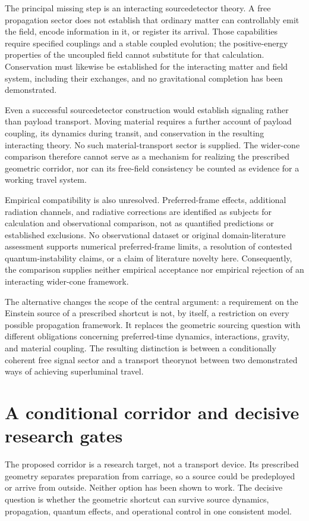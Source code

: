 \documentclass[11pt]{article}
\begin{document}
The principal missing step is an interacting source\textendash{}\allowbreak{}detector theory. A free propagation sector does not establish that ordinary matter can controllably emit the field, encode information in it, or register its arrival. Those capabilities require specified couplings and a stable coupled evolution; the positive-energy properties of the uncoupled field cannot substitute for that calculation. Conservation must likewise be established for the interacting matter and field system, including their exchanges, and no gravitational completion has been demonstrated.

Even a successful source\textendash{}\allowbreak{}detector construction would establish signaling rather than payload transport. Moving material requires a further account of payload coupling, its dynamics during transit, and conservation in the resulting interacting theory. No such material-transport sector is supplied. The wider-cone comparison therefore cannot serve as a mechanism for realizing the prescribed geometric corridor, nor can its free-field consistency be counted as evidence for a working travel system.

Empirical compatibility is also unresolved. Preferred-frame effects, additional radiation channels, and radiative corrections are identified as subjects for calculation and observational comparison, not as quantified predictions or established exclusions. No observational dataset or original domain-literature assessment supports numerical preferred-frame limits, a resolution of contested quantum-instability claims, or a claim of literature novelty here. Consequently, the comparison supplies neither empirical acceptance nor empirical rejection of an interacting wider-cone framework.

The alternative changes the scope of the central argument: a requirement on the Einstein source of a prescribed shortcut is not, by itself, a restriction on every possible propagation framework. It replaces the geometric sourcing question with different obligations concerning preferred-time dynamics, interactions, gravity, and material coupling. The resulting distinction is between a conditionally coherent free signal sector and a transport theory\textemdash{}not between two demonstrated ways of achieving superluminal travel.

\section{A conditional corridor and decisive research gates}
The proposed corridor is a research target, not a transport device. Its prescribed geometry separates preparation from carriage, so a source could be predeployed or arrive from outside. Neither option has been shown to work. The decisive question is whether the geometric shortcut can survive source dynamics, propagation, quantum effects, and operational control in one consistent model.
\end{document}
